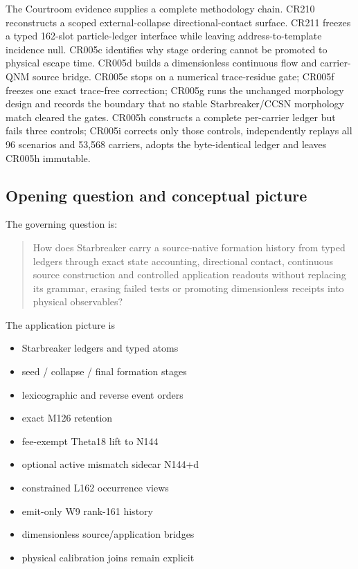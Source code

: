 The Courtroom evidence supplies a complete methodology chain. CR210
reconstructs a scoped external-collapse directional-contact surface.
CR211 freezes a typed 162-slot particle-ledger interface while leaving
address-to-template incidence null. CR005c identifies why stage ordering
cannot be promoted to physical escape time. CR005d builds a
dimensionless continuous flow and carrier-QNM source bridge. CR005e
stops on a numerical trace-residue gate; CR005f freezes one exact
trace-free correction; CR005g runs the unchanged morphology design and
records the boundary that no stable Starbreaker/CCSN morphology match
cleared the gates. CR005h constructs a complete per-carrier ledger but
fails three controls; CR005i corrects only those controls, independently
replays all 96 scenarios and 53,568 carriers, adopts the byte-identical
ledger and leaves CR005h immutable.

\subsection{Opening question and conceptual
picture}\label{viii-ch08-opening-question-and-conceptual-picture}

The governing question is:

\begin{quote}
How does Starbreaker carry a source-native formation history from typed
ledgers through exact state accounting, directional contact, continuous
source construction and controlled application readouts without
replacing its grammar, erasing failed tests or promoting dimensionless
receipts into physical observables?
\end{quote}

The application picture is

\begin{itemize}
\tightlist
\item
  Starbreaker ledgers and typed atoms
\item
  seed / collapse / final formation stages
\item
  lexicographic and reverse event orders
\item
  exact M126 retention
\item
  fee-exempt Theta18 lift to N144
\item
  optional active mismatch sidecar N144+d
\item
  constrained L162 occurrence views
\item
  emit-only W9 rank-161 history
\item
  dimensionless source/application bridges
\item
  physical calibration joins remain explicit
\end{itemize}

